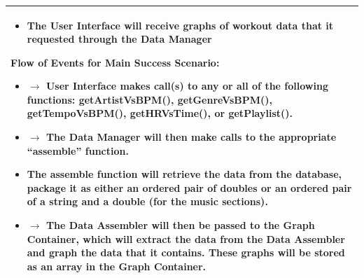 \documentclass[letterpaper,english, 12pt]{scrreprt}
\begin{document}
\begin{center}
\begin{longtable}{|C{15cm}|}
\begin{itemize}
                                        \item The User Interface will receive graphs of workout data that it requested through the Data Manager
                                \end{itemize}
                        \begin{flushleft}
                                \textbf{Flow of Events for Main Success Scenario: }
                        \end{flushleft}
                                \begin{itemize}
                                        \item $\rightarrow$ User Interface makes call(s) to any or all of the following functions: getArtistVsBPM(), getGenreVsBPM(), getTempoVsBPM(), getHRVsTime(), or getPlaylist().
                                        \item $\rightarrow$ The Data Manager will then make calls to the appropriate “assemble” function.
                                        \item The assemble function will retrieve the data from the database, package it as either an ordered pair of doubles or an ordered pair of a string and a double (for the music sections).
                                        \item $\rightarrow$ The Data Assembler will then be passed to the Graph Container, which will extract the data from the Data Assembler and graph the data that it contains. These graphs will be stored as an array in the Graph Container.
                                \end{itemize}
                       \\
                \hline
        \end{longtable}
\end{center}
\end{document}
